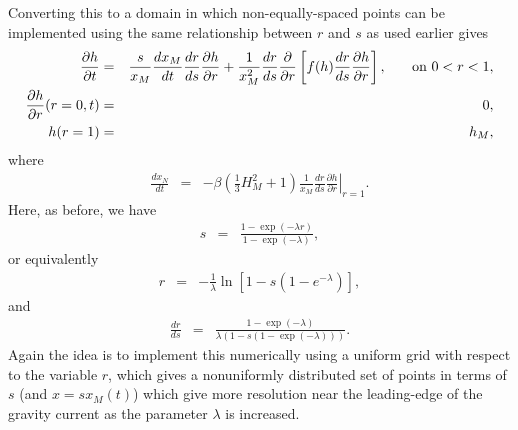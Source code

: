\documentclass[11pt]{article}
\newcommand{\bea}{\begin{eqnarray}}
\newcommand{\eea}{\end{eqnarray}}
\begin{document}
Converting this to a domain in which non-equally-spaced points can be implemented using the same relationship between $r$ and $s$ as used earlier gives
\bea
\label{eq:outer_h_fixed_domain_drds}
\frac{\partial h}{\partial t} & = & \frac{s}{x_M} \frac{dx_M}{dt} \frac{dr}{ds} \frac{\partial h}{\partial r} + \frac{1}{x_M^2} \frac{dr}{ds} \frac{\partial}{\partial r} 
\left[ f(h) \frac{dr}{ds} \frac{\partial h}{\partial r} \right], \hspace{0.25in} \mbox{on $0 < r < 1$},\\
\label{eq:outer_bc1_fixed_domain_drds}
\frac{\partial h}{\partial r}(r=0,t) & = & 0,\\
\label{eq:outer_bc2_fixed_domain_drds}
h(r=1) & = & h_M,
\eea
where
\bea
\label{eq:outer_bc3_fixed_domain_drds}
\frac{dx_N}{dt} & = & - \beta \left( \frac{1}{3} H^2_M + 1 \right)  \frac{1}{x_M} \frac{dr}{ds} \left. \frac{\partial h}{\partial r} \right|_{r=1}.
\eea
Here, as before, we have
\bea
s & = & \frac{1- \exp (-\lambda r)}{1 - \exp (-\lambda)},
\eea
or equivalently
\bea
r & = & - \frac{1}{\lambda} \ln \left[ 1 - s (1-e^{-\lambda}) \right],
\eea
and
\bea
\frac{dr}{ds} & = & \frac{ 1 - \exp(-\lambda) } {\lambda  (1 - s(1 - \exp(-\lambda)))}.
\eea
Again the idea is to implement this numerically using a uniform grid with respect to the variable $r$, which gives a nonuniformly distributed set of points in terms of
$s$ (and $x= s x_M(t)$) which give more resolution near the leading-edge of the gravity current as the parameter $\lambda$ is increased.
\end{document}
